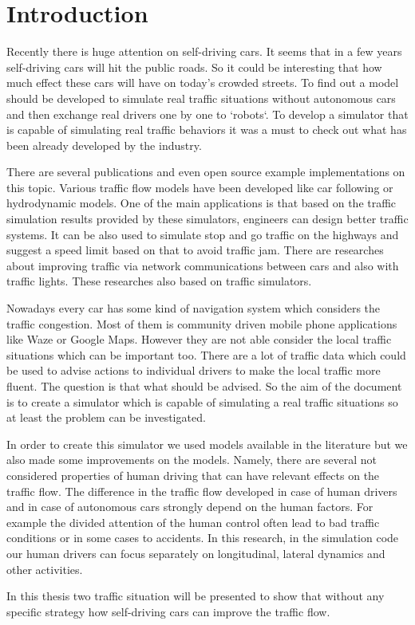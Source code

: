 \chapter{Introduction}
Recently there is huge attention on self-driving cars. It seems that in a few years self-driving cars will hit the public roads. So it could be interesting that how much effect these cars will have on today's crowded streets. To find out a model should be developed to simulate real traffic situations without autonomous cars and then exchange real drivers one by one to `robots`. To develop a simulator that is capable of simulating real traffic behaviors it was a must to check out what has been already developed by the industry.

There are several publications and even open source example implementations on this topic. Various traffic flow models have been developed like car following or hydrodynamic models. One of the main applications is that based on the traffic simulation results provided by these simulators, engineers can design better traffic systems. It can be also used to simulate stop and go traffic on the highways and suggest a speed limit based on that to avoid traffic jam. There are researches about improving traffic via network communications between cars and also with traffic lights. These researches also based on traffic simulators.

Nowadays every car has some kind of navigation system which considers the traffic congestion. Most of them is community driven mobile phone applications like Waze or Google Maps. However they are not able consider the local traffic situations which can be important too. There are a lot of traffic data which could be used to advise actions to individual drivers to make the local traffic more fluent. The question is that what should be advised. So the aim of the document is to create a simulator which is capable of simulating a real traffic situations so at least the problem can be investigated.

In order to create this simulator we used models available in the literature but we also made some improvements on the models. Namely, there are several not considered properties of human driving that can have relevant effects on the traffic flow. The difference in the traffic flow developed in case of human drivers and in case of autonomous cars strongly depend on the human factors. For example the divided attention of the human control often lead to bad traffic conditions or in some cases to accidents. In this research, in the simulation code our human drivers can focus separately on longitudinal, lateral dynamics and other activities.

In this thesis  two traffic situation will be presented to show that without any specific strategy how self-driving cars can improve the traffic flow.